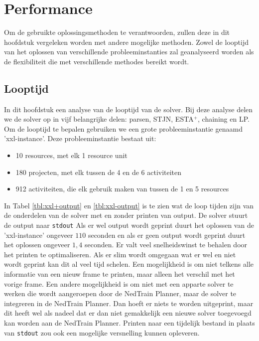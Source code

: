 \section{Performance}
Om de gebruikte oplossingsmethoden te verantwoorden, zullen deze in dit hoofdstuk vergeleken worden met andere mogelijke methoden. Zowel de looptijd van het oplossen van verschillende probleeminstanties zal geanalyseerd worden als de flexibiliteit die met verschillende methodes bereikt wordt.

\subsection{Looptijd}
In dit hoofdstuk een analyse van de looptijd van de solver. Bij deze analyse delen we de solver op in vijf belangrijke delen: parsen, STJN, ESTA$^+$, chaining en LP. Om de looptijd te bepalen gebruiken we een grote probleeminstantie genaamd 'xxl-instance'. Deze probleeminstantie bestaat uit:
\begin{itemize}
    \item 10 resources, met elk 1 resource unit
    \item 180 projecten, met elk tussen de 4 en de 6 activiteiten
    \item 912 activiteiten, die elk gebruik maken van tussen de 1 en 5 resources
\end{itemize}

In Tabel \ref{tbl:xxl+output} en \ref{tbl:xxl-output} is te zien wat de loop tijden zijn van de onderdelen van de solver met en zonder printen van output. De solver stuurt de output naar \texttt{stdout} Als er wel output wordt geprint duurt het oplossen van de 'xxl-instance' ongeveer $110$ seconden en als er geen output wordt geprint duurt het oplossen ongeveer $1,4$ seconden. Er valt veel snelheidswinst te behalen door het printen te optimaliseren. Als er slim wordt omgegaan wat er wel en niet wordt geprint kan dit al veel tijd schelen. Een mogelijkheid is om niet telkens alle informatie van een nieuw frame te printen, maar alleen het verschil met het vorige frame. Een andere mogelijkheid is om niet met een apparte solver te werken die wordt aangeroepen door de NedTrain Planner, maar de solver te integreren in de NedTrain Planner. Dan hoeft er niets te worden uitgeprint, maar dit heeft wel als nadeel dat er dan niet gemakkelijk een nieuwe solver toegevoegd kan worden aan de NedTrain Planner. Printen naar een tijdelijk bestand in plaats van \texttt{stdout} zou ook een mogelijke versnelling kunnen opleveren. 

